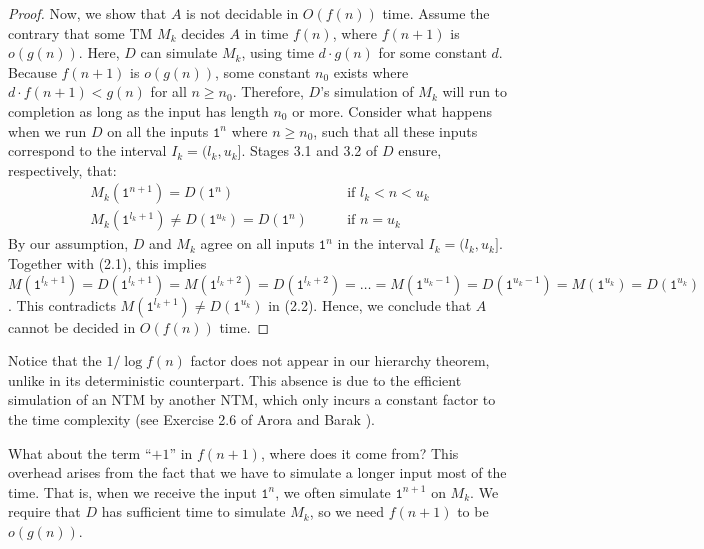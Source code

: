 \documentclass[11pt,twoside=off,numbers=noenddot]{scrbook}
\begin{document}
\begin{proof}
  Now, we show that $A$ is not decidable in $O(f(n))$ time. Assume the contrary that some TM $M_k$ decides $A$ in time $f(n)$, where $f(n + 1)$ is $o(g(n))$. Here, $D$ can simulate $M_k$, using time $d \cdot g(n)$ for some constant $d$. Because $f(n + 1)$ is $o(g(n))$, some constant $n_0$ exists where $d \cdot f(n + 1) < g(n)$ for all $n \geq n_0$. Therefore, $D$'s simulation of $M_k$ will run to completion as long as the input has length $n_0$ or more. Consider what happens when we run $D$ on all the inputs $\texttt{1}^n$ where $n \geq n_0$, such that all these inputs correspond to the interval $I_k = (l_k, u_k]$. Stages 3.1 and 3.2 of $D$ ensure, respectively, that:
  \begin{align}
    \text{$M_k(\texttt{1}^{n + 1}) = D(\texttt{1}^n)$} & \qquad \text{if $l_k < n < u_k$} \\
    \text{$M_k(\texttt{1}^{l_k + 1}) \neq D(\texttt{1}^{u_k}) = D(\texttt{1}^n)$} & \qquad \text{if $n = u_k$}
  \end{align}
  By our assumption, $D$ and $M_k$ agree on all inputs $\texttt{1}^n$ in the interval $I_k = (l_k, u_k]$. Together with (2.1), this implies $M(\texttt{1}^{l_k + 1}) = D(\texttt{1}^{l_k + 1}) = M(\texttt{1}^{l_k + 2}) = D(\texttt{1}^{l_k + 2}) = \dots = M(\texttt{1}^{u_k - 1}) = D(\texttt{1}^{u_k - 1}) = M(\texttt{1}^{u_k}) = D(\texttt{1}^{u_k})$. This contradicts $M(\texttt{1}^{l_k + 1}) \neq D(\texttt{1}^{u_k})$ in (2.2). Hence, we conclude that $A$ cannot be decided in $O(f(n))$ time.
\end{proof}

\begin{remark}
  Notice that the $1 / \log f(n)$ factor does not appear in our hierarchy theorem, unlike in its deterministic counterpart. This absence is due to the efficient simulation of an NTM by another NTM, which only incurs a constant factor to the time complexity (see Exercise 2.6 of Arora and Barak \cite{arora2009computational}).
\end{remark}

\begin{remark}
  What about the term ``$+ 1$'' in $f(n + 1)$, where does it come from? This overhead arises from the fact that we have to simulate a longer input most of the time. That is, when we receive the input $\texttt{1}^{n}$, we often simulate $\texttt{1}^{n + 1}$ on $M_k$. We require that $D$ has sufficient time to simulate $M_k$, so we need $f(n + 1)$ to be $o(g(n))$.
\end{remark}
\end{document}
